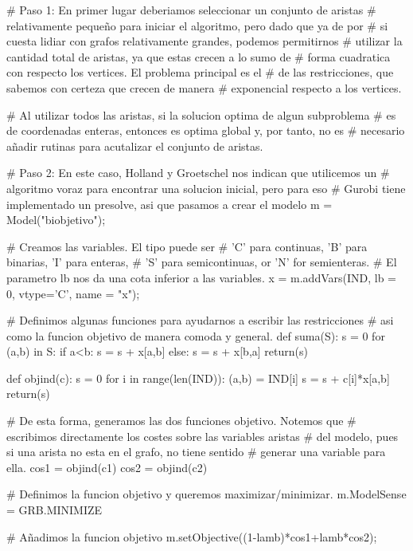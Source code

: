 \documentclass[twoside,a4paper,openright,12pt,tikz]{book}
\begin{document}
\begin{pythone}
    # Paso 1: En primer lugar deberiamos seleccionar un conjunto de aristas
    # relativamente pequeño para iniciar el algoritmo, pero dado que ya de por
    # si cuesta lidiar con grafos relativamente grandes, podemos permitirnos
    # utilizar la cantidad total de aristas, ya que estas crecen a lo sumo de 
    # forma cuadratica con respecto los vertices. El problema principal es el
    # de las restricciones, que sabemos con certeza que crecen de manera
    # exponencial respecto a los vertices. 
    
    # Al utilizar todos las aristas, si la solucion optima de algun subproblema
    # es de coordenadas enteras, entonces es optima global y, por tanto, no es
    # necesario añadir rutinas para acutalizar el conjunto de aristas.
    
    # Paso 2: En este caso, Holland y Groetschel nos indican que utilicemos un 
    # algoritmo voraz para encontrar una solucion inicial, pero para eso
    # Gurobi tiene implementado un presolve, asi que pasamos a crear el modelo
    m = Model("biobjetivo");

    # Creamos las variables. El tipo puede ser 
    # 'C' para continuas, 'B' para binarias, 'I' para enteras,
    # 'S' para semicontinuas, or 'N' for semienteras.
    # El parametro lb nos da una cota inferior a las variables.
    x = m.addVars(IND, lb = 0, vtype='C', name = "x");
    
    # Definimos algunas funciones para ayudarnos a escribir las restricciones
    # asi como la funcion objetivo de manera comoda y general.
    def suma(S):
        s = 0
        for (a,b) in S:
            if a<b:
                s = s + x[a,b]
            else:
                s = s + x[b,a]
        return(s)
        
    def objind(c):
        s = 0
        for i in range(len(IND)):
            (a,b) = IND[i]
            s = s + c[i]*x[a,b] 
        return(s)
    
    # De esta forma, generamos las dos funciones objetivo. Notemos que 
    # escribimos directamente los costes sobre las variables aristas
    # del modelo, pues si una arista no esta en el grafo, no tiene sentido
    # generar una variable para ella.       
    cos1 = objind(c1)
    cos2 = objind(c2)
    
    # Definimos la funcion objetivo y queremos maximizar/minimizar.
    m.ModelSense = GRB.MINIMIZE
    
    # Añadimos la funcion objetivo
    m.setObjective((1-lamb)*cos1+lamb*cos2); 
    

\end{pythone}
\end{document}
